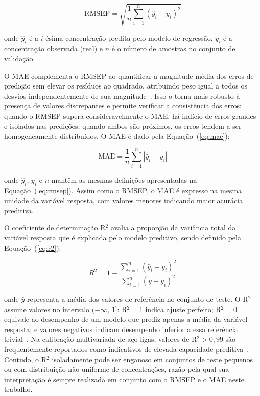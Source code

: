 \begin{equation}
   \textrm{RMSEP} = \sqrt{\dfrac{1}{n}\sum_{i=1}^{n}(\widehat{y}_i-y_i)^2}
\label{eq:rmsep}
\end{equation}

\noindent onde $\widehat{y}_i$ é a $i$-ésima concentração predita 
pelo modelo de regressão, $y_i$ é a concentração observada (real) 
e $n$ é o número de amostras no conjunto de validação.

O \gls{MAE} complementa o \gls{RMSEP} ao quantificar a magnitude 
média dos erros de predição sem elevar os resíduos ao quadrado, 
atribuindo peso igual a todos os desvios independentemente de sua 
magnitude~\cite{hodson2022rmse}. Isso o torna mais robusto 
à presença de valores discrepantes e permite verificar a 
consistência dos erros: quando o \gls{RMSEP} supera 
consideravelmente o \gls{MAE}, há indício de erros grandes e 
isolados nas predições; quando ambos são próximos, os erros tendem 
a ser homogeneamente distribuídos. O \gls{MAE} é dado pela Equação~(\ref{eq:mae}):

\begin{equation}
   \textrm{MAE} = \dfrac{1}{n}\sum_{i=1}^{n}|\widehat{y}_i - y_i|
\label{eq:mae}
\end{equation}

\noindent onde $\widehat{y}_i$, $y_i$ e $n$ mantêm as mesmas 
definições apresentadas na Equação~(\ref{eq:rmsep}). Assim como 
o \gls{RMSEP}, o \gls{MAE} é expresso na mesma unidade da variável 
resposta, com valores menores indicando maior acurácia preditiva.

O coeficiente de determinação R$^2$ avalia a proporção da variância total da variável resposta que é explicada pelo modelo preditivo, sendo definido pela Equação~(\ref{eq:r2}):

\begin{equation}
   R^2 = 1 - \dfrac{\displaystyle\sum_{i=1}^{n}(\widehat{y}_i - y_i)^2}
                   {\displaystyle\sum_{i=1}^{n}(\bar{y} - y_i)^2}
\label{eq:r2}
\end{equation}

\noindent onde $\bar{y}$ representa a média dos valores de referência 
no conjunto de teste. O R$^2$ assume valores no intervalo 
$(-\infty,\, 1]$: R$^2 = 1$ indica ajuste perfeito; R$^2 = 0$ 
equivale ao desempenho de um modelo que prediz apenas a média da 
variável resposta; e valores negativos indicam desempenho inferior 
a essa referência trivial~\cite{ezenarro2025chemometric}. Na 
calibração multivariada de aço-ligas, valores de R$^2 > 0{,}99$ 
são frequentemente reportados como indicativos de elevada capacidade 
preditiva~\cite{Westad2024,kumari2024,perisdiaz2021}. Contudo, o R$^2$ 
isoladamente pode ser enganoso em conjuntos de teste pequenos ou 
com distribuição não uniforme de concentrações, razão pela qual 
sua interpretação é sempre realizada em conjunto com o \gls{RMSEP} 
e o \gls{MAE} neste trabalho.